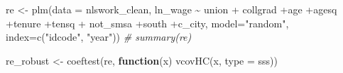 \documentclass[
]{article}
\newenvironment{Shaded}{\begin{snugshade}}{\end{snugshade}}
\newcommand{\AttributeTok}[1]{\textcolor[rgb]{0.77,0.63,0.00}{#1}}
\newcommand{\CommentTok}[1]{\textcolor[rgb]{0.56,0.35,0.01}{\textit{#1}}}
\newcommand{\ControlFlowTok}[1]{\textcolor[rgb]{0.13,0.29,0.53}{\textbf{#1}}}
\newcommand{\FunctionTok}[1]{\textcolor[rgb]{0.00,0.00,0.00}{#1}}
\newcommand{\NormalTok}[1]{#1}
\newcommand{\OtherTok}[1]{\textcolor[rgb]{0.56,0.35,0.01}{#1}}
\newcommand{\SpecialCharTok}[1]{\textcolor[rgb]{0.00,0.00,0.00}{#1}}
\newcommand{\StringTok}[1]{\textcolor[rgb]{0.31,0.60,0.02}{#1}}
\begin{document}
\begin{Shaded}
\begin{Highlighting}[]
\NormalTok{  re }\OtherTok{\textless{}{-}} \FunctionTok{plm}\NormalTok{(}\AttributeTok{data =}\NormalTok{ nlswork\_clean, ln\_wage }\SpecialCharTok{\textasciitilde{}}\NormalTok{ union }\SpecialCharTok{+}
\NormalTok{              collgrad }\SpecialCharTok{+}\NormalTok{age }\SpecialCharTok{+}\NormalTok{agesq }\SpecialCharTok{+}\NormalTok{tenure }\SpecialCharTok{+}\NormalTok{tensq }\SpecialCharTok{+}
\NormalTok{              not\_smsa }\SpecialCharTok{+}\NormalTok{south }\SpecialCharTok{+}\NormalTok{c\_city, }\AttributeTok{model=}\StringTok{"random"}\NormalTok{,}
            \AttributeTok{index=}\FunctionTok{c}\NormalTok{(}\StringTok{"idcode"}\NormalTok{, }\StringTok{"year"}\NormalTok{))}
      \CommentTok{\# summary(re)}

\NormalTok{  re\_robust }\OtherTok{\textless{}{-}} \FunctionTok{coeftest}\NormalTok{(re, }\ControlFlowTok{function}\NormalTok{(x) }\FunctionTok{vcovHC}\NormalTok{(x, }\AttributeTok{type =} \StringTok{\textquotesingle{}sss\textquotesingle{}}\NormalTok{))}
\end{Highlighting}
\end{Shaded}
\end{document}
